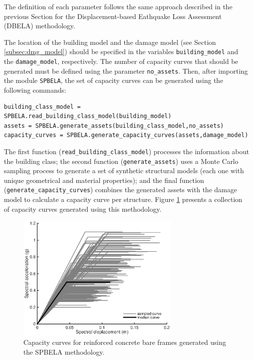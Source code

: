 The definition of each parameter follows the same approach described in the previous Section for the Displacement-based Eathquake Loss Assessment (DBELA) methodology. 

The location of the building model and the damage model (see Section \ref{subsec:dmg_model}) should be specified in the variables \verb=building_model= and the \verb=damage_model=, respectively. The number of capacity curves that should be generated must be defined using the parameter \verb=no_assets=. Then, after importing the module \verb=SPBELA=, the set of capacity curves can be generated using the following commands:

\begin{Verbatim}[frame=single, commandchars=\\\{\}, samepage=true]
building_class_model = SPBELA.read_building_class_model(building_model)
assets = SPBELA.generate_assets(building_class_model,no_assets)
capacity_curves = SPBELA.generate_capacity_curves(assets,damage_model)
\end{Verbatim}

The first function (\verb=read_building_class_model=) processes the information about the building class; the second function (\verb=generate_assets=) uses a Monte Carlo sampling process to generate a set of synthetic structural models (each one with unique geometrical and material properties); and the final function (\verb=generate_capacity_curves=) combines the generated assets with the damage model to calculate a capacity curve per structure. Figure \ref{fig:SPBELA_cc} presents a collection of capacity curves generated using this methodology.

\begin{figure}[htb]
  \centering
      \includegraphics[width=8cm]{Figures/SPBELA_cc.eps}
  \caption{Capacity curves for reinforced concrete bare frames generated using the SPBELA methodology.}
  \label{fig:SPBELA_cc}
\end{figure}



